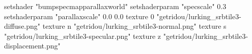 setshader "bumpspecmapparallaxworld"
setshaderparam "specscale" 0.3
setshaderparam "parallaxscale" 0.0 0.0
texture 0 "getridou/lurking_srbtile3-diffuse.png"
texture n "getridou/lurking_srbtile3-normal.png"
texture s "getridou/lurking_srbtile3-specular.png"
texture z "getridou/lurking_srbtile3-displacement.png"